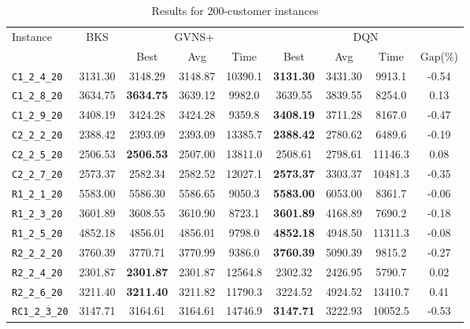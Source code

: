 \begin{table}[ht]
\centering
\small
\setlength{\tabcolsep}{5pt}
\caption{Results for 200-customer instances}
\vspace{4mm}
\begin{adjustbox}{width=\textwidth}
\begin{tabular}{l c c c c @{\hspace{8pt}} c c c c @{\hspace{8pt}}}
\toprule
\multirow{2}{*}{Instance} & \multirow{2}{*}{BKS} & \multicolumn{3}{c}{GVNS+} & \multicolumn{4}{c}{DQN} \\
\cmidrule(lr){3-5} \cmidrule(lr){6-9}
 &  & Best & Avg & Time & Best & Avg & Time & Gap(\%) \\
\midrule
\texttt{C1\_2\_4\_20} & 3131.30 & 3148.29 & 3148.87 & 10390.1 & \textbf{3131.30} & 3431.30 & 9913.1 & -0.54 \\
\texttt{C1\_2\_8\_20} & 3634.75 & \textbf{3634.75} & 3639.12 & 9982.0 & 3639.55 & 3839.55 & 8254.0 & 0.13 \\
\texttt{C1\_2\_9\_20} & 3408.19 & 3424.28 & 3424.28 & 9359.8 & \textbf{3408.19} & 3711.28 & 8167.0 & -0.47 \\
\texttt{C2\_2\_2\_20} & 2388.42 & 2393.09 & 2393.09 & 13385.7 & \textbf{2388.42} & 2780.62 & 6489.6 & -0.19 \\
\texttt{C2\_2\_5\_20} & 2506.53 & \textbf{2506.53} & 2507.00 & 13811.0 & 2508.61 & 2798.61 & 11146.3 & 0.08 \\
\texttt{C2\_2\_7\_20} & 2573.37 & 2582.34 & 2582.52 & 12027.1 & \textbf{2573.37} & 3303.37 & 10481.3 & -0.35 \\
\texttt{R1\_2\_1\_20} & 5583.00 & 5586.30 & 5586.65 & 9050.3 & \textbf{5583.00} & 6053.00 & 8361.7 & -0.06 \\
\texttt{R1\_2\_3\_20} & 3601.89 & 3608.55 & 3610.90 & 8723.1 & \textbf{3601.89} & 4168.89 & 7690.2 & -0.18 \\
\texttt{R1\_2\_5\_20} & 4852.18 & 4856.01 & 4856.01 & 9798.0 & \textbf{4852.18} & 4948.50 & 11311.3 & -0.08 \\
\texttt{R2\_2\_2\_20} & 3760.39 & 3770.71 & 3770.99 & 9386.0 & \textbf{3760.39} & 5090.39 & 9815.2 & -0.27 \\
\texttt{R2\_2\_4\_20} & 2301.87 & \textbf{2301.87} & 2301.87 & 12564.8 & 2302.32 & 2426.95 & 5790.7 & 0.02 \\
\texttt{R2\_2\_6\_20} & 3211.40 & \textbf{3211.40} & 3211.82 & 11790.3 & 3224.52 & 4924.52 & 13410.7 & 0.41 \\
\texttt{RC1\_2\_3\_20} & 3147.71 & 3164.61 & 3164.61 & 14746.9 & \textbf{3147.71} & 3222.93 & 10052.5 & -0.53 \\

\end{tabular}
\end{adjustbox}
\end{table}
